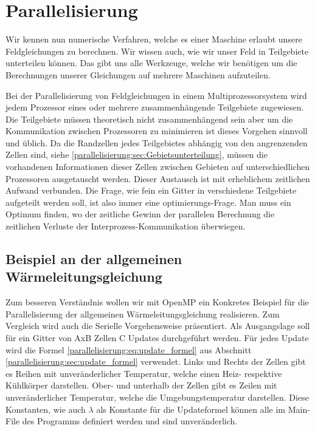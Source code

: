 %
%
%
%
\section{Parallelisierung
\label{parallelisierung:sec:Parallelisierung}}
Wir kennen nun numerische Verfahren, welche es einer Maschine erlaubt unsere Feldgleichungen zu berechnen.
Wir wissen auch, wie wir unser Feld in Teilgebiete unterteilen können.
Das gibt uns alle Werkzeuge, welche wir benötigen um die Berechnungen unserer Gleichungen auf mehrere Maschinen aufzuteilen.

Bei der Parallelisierung von Feldgleichungen in einem Multiprozessorsystem wird jedem Prozessor eines oder mehrere zusammenhängende Teilgebiete zugewiesen.
Die Teilgebiete müssen theoretisch nicht zusammenhängend sein aber um die Kommunikation zwischen Prozessoren zu minimieren ist dieses Vorgehen sinnvoll und üblich.
Da die Randzellen jedes Teilgebietes abhängig von den angrenzenden Zellen sind, siehe \ref{parallelisierung:sec:Gebietsunterteilung}, müssen die vorhandenen Informationen dieser Zellen zwischen Gebieten auf unterschiedlichen Prozessoren ausgetauscht werden.
Dieser Austausch ist mit erheblichem zeitlichen Aufwand verbunden.
Die Frage, wie fein ein Gitter in verschiedene Teilgebiete aufgeteilt werden soll, ist also immer eine optimierungs-Frage.
Man muss ein Optimum finden, wo der zeitliche Gewinn der parallelen Berechnung die zeitlichen Verluste der Interprozess-Kommunikation überwiegen.




\subsection{Beispiel an der allgemeinen Wärmeleitungsgleichung
\label{parallelisierung:sub:BeispielParallelisierung}}
Zum besseren Verständnis wollen wir mit OpenMP ein Konkretes Beispiel für die Parallelisierung der allgemeinen Wärmeleitungsgleichung realisieren.
Zum Vergleich wird auch die Serielle Vorgehensweise präsentiert.
Als Ausgangslage soll für ein Gitter von AxB Zellen C Updates durchgeführt werden.
Für jedes Update wird die Formel \ref{parallelisierung:eq:update_formel} aus Abschnitt \ref{parallelisierung:sec:update_formel} verwendet.
Links und Rechts der Zellen gibt es Reihen mit unveränderlicher Temperatur, welche einen Heiz- respektive Kühlkörper darstellen.
Ober- und unterhalb der Zellen gibt es Zeilen mit unveränderlicher Temperatur, welche die Umgebungstemperatur darstellen.
Diese Konstanten, wie auch $\lambda$ als Konstante für die Updateformel können alle im Main-File des Programms definiert werden und sind unveränderlich.


